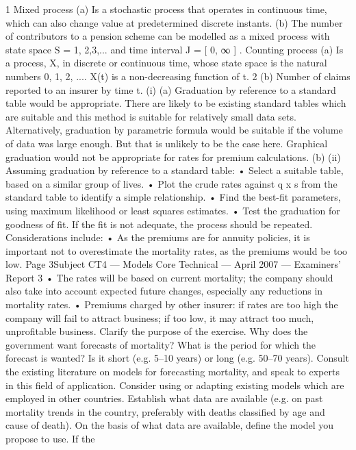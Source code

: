 \documentclass[a4paper,12pt]{article}
\begin{document}
\begin{enumerate}
1
Mixed process
(a) Is a stochastic process that operates in continuous time, which can also change
value at predetermined discrete instants.
(b) The number of contributors to a pension scheme can be modelled as a mixed
process with state space S = { 1, 2,3,... } and time interval J = [ 0, ∞ ] .
Counting process
(a)
Is a process, X, in discrete or continuous time, whose state space is the natural
numbers {0, 1, 2, ...}.
X(t) is a non-decreasing function of t.
2
(b) Number of claims reported to an insurer by time t.
(i) (a)
Graduation by reference to a standard table would be appropriate.
There are likely to be existing standard tables which are suitable and
this method is suitable for relatively small data sets.
Alternatively, graduation by parametric formula would be suitable if
the volume of data was large enough. But that is unlikely to be the
case here.
Graphical graduation would not be appropriate for rates for premium
calculations.
(b)
(ii)
Assuming graduation by reference to a standard table:
• Select a suitable table, based on a similar group of lives.
• Plot the crude rates against q x s from the standard table to identify a
simple relationship.
• Find the best-fit parameters, using maximum likelihood or least
squares estimates.
• Test the graduation for goodness of fit. If the fit is not adequate,
the process should be repeated.
Considerations include:
•
As the premiums are for annuity policies, it is important not to
overestimate the mortality rates, as the premiums would be too low.
Page 3Subject CT4 — Models Core Technical — April 2007 — Examiners’ Report
3
• The rates will be based on current mortality; the company should also take
into account expected future changes, especially any reductions in
mortality rates.
• Premiums charged by other insurer: if rates are too high the company will
fail to attract business; if too low, it may attract too much, unprofitable
business.
Clarify the purpose of the exercise. Why does the government want forecasts of
mortality? What is the period for which the forecast is wanted? Is it short (e.g. 5–10
years) or long (e.g. 50–70 years).
Consult the existing literature on models for forecasting mortality, and speak to
experts in this field of application. Consider using or adapting existing models which
are employed in other countries.
Establish what data are available (e.g. on past mortality trends in the country,
preferably with deaths classified by age and cause of death).
On the basis of what data are available, define the model you propose to use. If the

\end{enumerate}
\end{document}
